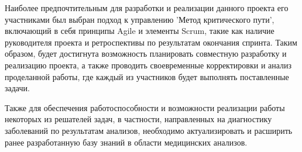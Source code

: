 Наиболее предпочтительным для разработки и реализации данного проекта его участниками был выбран подход к управлению 'Метод критического пути', включающий в себя принципы Agile и элементы Scrum, такие как наличие руководителя проекта и ретроспективы по результатам окончания спринта. Таким образом, будет достигнута возможность планировать совместную разработку и реализацию проекта, а также проводить своевременные корректировки и анализ проделанной работы, где каждый из участников будет выполнять поставленные задачи.

Также для обеспечения работоспособности и возможности реализации работы некоторых из решателей задач, в частности, направленных на диагностику заболеваний по результатам анализов, необходимо актуализировать и расширить ранее разработанную базу знаний в области медицинских анализов.













